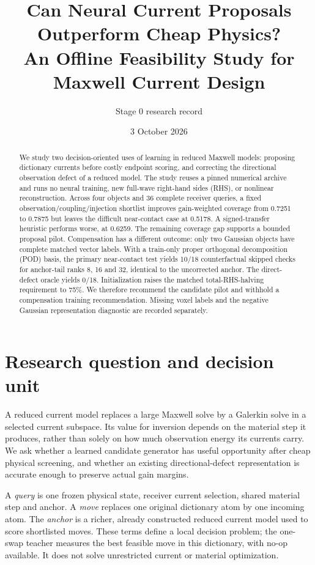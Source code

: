\documentclass[11pt,a4paper]{article}
\title{Can Neural Current Proposals Outperform Cheap Physics?\\An Offline Feasibility Study for Maxwell Current Design}
\author{Stage 0 research record}
\date{3 October 2026}
\begin{document}
\maketitle
\begin{abstract}
We study two decision-oriented uses of learning in reduced Maxwell models: proposing dictionary currents before costly endpoint scoring, and correcting the directional observation defect of a reduced model. The study reuses a pinned numerical archive and runs no neural training, new full-wave right-hand sides (RHS), or nonlinear reconstruction. Across four objects and 36 complete receiver queries, a fixed observation/coupling/injection shortlist improves gain-weighted coverage from 0.7251 to 0.7875 but leaves the difficult near-contact case at 0.5178. A signed-transfer heuristic performs worse, at 0.6259. The remaining coverage gap supports a bounded proposal pilot. Compensation has a different outcome: only two Gaussian objects have complete matched vector labels. With a train-only proper orthogonal decomposition (POD) basis, the primary near-contact test yields 10/18 counterfactual skipped checks for anchor-tail ranks 8, 16 and 32, identical to the uncorrected anchor. The direct-defect oracle yields 0/18. Initialization raises the matched total-RHS-halving requirement to 75\%. We therefore recommend the candidate pilot and withhold a compensation training recommendation. Missing voxel labels and the negative Gaussian representation diagnostic are recorded separately.
\end{abstract}

\section{Research question and decision unit}
A reduced current model replaces a large Maxwell solve by a Galerkin solve in a selected current subspace. Its value for inversion depends on the material step it produces, rather than solely on how much observation energy its currents carry. We ask whether a learned candidate generator has useful opportunity after cheap physical screening, and whether an existing directional-defect representation is accurate enough to preserve actual gain margins.

A \emph{query} is one frozen physical state, receiver current selection, shared material step and anchor. A \emph{move} replaces one original dictionary atom by one incoming atom. The \emph{anchor} is a richer, already constructed reduced current model used to score shortlisted moves. These terms define a local decision problem; the one-swap teacher measures the best feasible move in this dictionary, with no-op available. It does not solve unrestricted current or material optimization.
\end{document}
